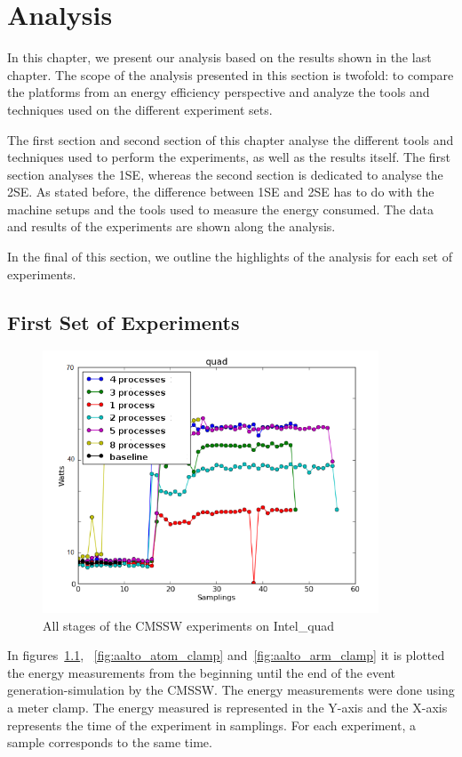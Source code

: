 \chapter{Analysis}



In this chapter, we present our analysis based on the results shown in the last chapter. The scope of the analysis presented in this section is twofold: to compare the
platforms from an energy efficiency perspective and analyze the tools and techniques used on the different experiment sets. 


The first section and second section of this chapter analyse the different tools and techniques used
to perform the experiments, as well as the results itself. The first section analyses the 1SE, whereas the second section is dedicated to analyse the 2SE. As stated before, the difference between 1SE and 2SE has to do with the machine setups and the tools used to measure the energy consumed. The data and results of the experiments are shown along the analysis.

In the final of this section, we outline the highlights of the analysis for
each set of experiments.

\section{First Set of Experiments}

\begin{figure}[h]
  \centering
    \includegraphics[width=100mm]{"img/aalto/aalto_total_quad"}
    \caption{All stages of the CMSSW experiments on Intel\_quad}
    \label{fig:aalto_quad_clamp}
\end{figure}



In figures~\ref{fig:aalto_quad_clamp}, ~\ref{fig:aalto_atom_clamp} 
and~\ref{fig:aalto_arm_clamp} it is plotted the energy measurements from the beginning until the end of the event generation-simulation by the CMSSW. The energy measurements were done using a meter clamp. The energy measured is represented in the Y-axis and the X-axis represents the time of the experiment in samplings. For each experiment, a sample corresponds to the same time.

